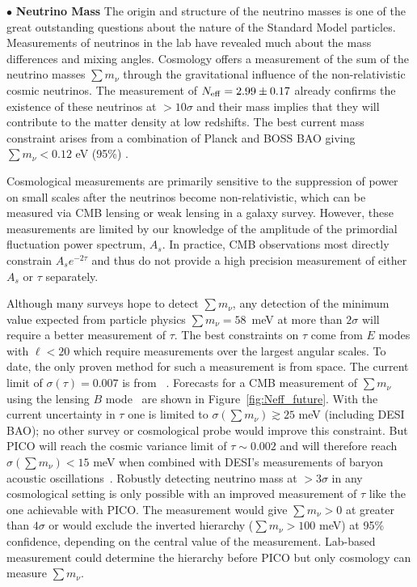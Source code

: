 \documentclass[PICOReport.tex]{subfiles}
\begin{document}
\noindent$\bullet$ {\bf Neutrino Mass} \hspace{0.1in} \label{neutrino_fundamental} The origin and structure of the neutrino masses is one of the great outstanding  questions about the nature of the Standard Model particles.  Measurements of neutrinos in the lab have revealed much  about the mass differences and mixing angles.  Cosmology offers a  measurement of the sum of the neutrino masses $\sum m_\nu$ through the gravitational influence of the non-relativistic  cosmic neutrinos.  The measurement of ${N_{\rm eff}} = 2.99 \pm 0.17$ \cite{Planck2018_VI} already confirms the existence of these neutrinos at $>10\sigma$ and their mass implies that they will contribute to the matter density at low redshifts.  The best current mass constraint arises from a combination of  Planck and BOSS \ac{BAO} giving $\sum m_\nu < 0.12$ eV (95\%) \cite{Planck2018_VI}.

Cosmological measurements are primarily sensitive to the suppression of power on small scales after the neutrinos become non-relativistic, which can be measured via CMB lensing or weak lensing in a galaxy survey.  However, these measurements are limited by our knowledge of the amplitude of the primordial fluctuation power spectrum, $A_s$.  In practice, CMB observations most directly constrain $A_s e^{-2 \tau}$ and thus do not provide a high precision measurement of either $A_s$ or $\tau$ separately.  


Although many surveys hope to detect $\sum m_\nu$, any detection of the minimum value expected from particle physics $\sum m_\nu = 58$~meV at more than $2 \sigma$ will require a better measurement of $\tau$.  The best constraints on $\tau$ come from $E$ modes with $\ell < 20$ which require measurements over the largest angular scales. To date, the only proven method for such a measurement is from space. The current limit of $\sigma({\tau}) = 0.007$ is from \planck~\cite{planck2016_xlvi}.  Forecasts for a CMB measurement of $\sum m_\nu$ using the lensing $B$ mode~\cite{Kaplinghat:2003bh} are shown in Figure~\ref{fig:Neff_future}.  With the current uncertainty in $\tau$ one is limited to  $\sigma(\sum m_\nu) \gtrsim 25$ meV (including DESI BAO); no other survey or cosmological probe would improve this constraint.  But PICO will reach the cosmic variance limit of $\tau \sim 0.002$ and will therefore reach $\sigma(\sum m_\nu) < 15$ meV when combined with DESI's measurements of baryon acoustic oscillations~\cite{Levi:2013gra}.  Robustly detecting neutrino mass at  $> 3\sigma$ in any cosmological setting is only possible with an improved measurement of $\tau$ like the one achievable with PICO. The measurement would give  $\sum m_\nu>0$ at greater than $4\sigma$ or would exclude the inverted hierarchy ($\sum m_\nu > 100$ meV) at 95\% confidence, depending on the central value of the measurement.  Lab-based measurement could determine the hierarchy before PICO but only cosmology can measure $\sum m_\nu$.
\end{document}
